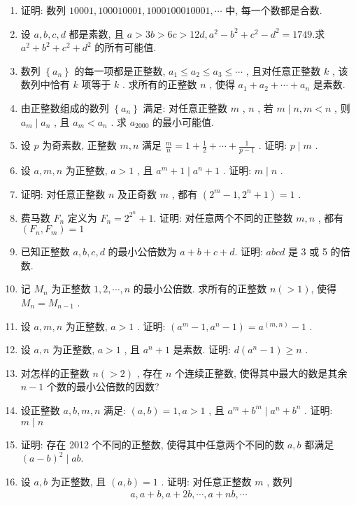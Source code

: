 \begin{enumerate}
	\item 证明: 数列 $10001,100010001,1000100010001, \cdots$ 中, 每一个数都是合数.
	\item 设 $a ,  b ,  c ,  d$ 都是素数, 且 $a>3 b>6 c>12 d, a^{2}-b^{2}+c^{2}-d^{2}=1749$.求 $a^{2}+b^{2}+c^{2}+d^{2}$ 的所有可能值.
	\item 数列 $\left\{a_{n}\right\}$ 的每一项都是正整数,  $a_{1} \leqslant a_{2} \leqslant a_{3} \leqslant \cdots$ , 且对任意正整数 $k$ , 该数列中恰有 $k$ 项等于 $k$ . 求所有的正整数 $n$ , 使得 $a_{1}+a_{2}+\cdots+a_{n}$ 是素数.
	\item 由正整数组成的数列 $\left\{a_{n}\right\}$ 满足: 对任意正整数 $m$ ,  $n$ , 若 $m \mid n ,  m<n$ , 则 $a_{m} \mid a_{n}$ , 且 $a_{m}<a_{n}$ . 求 $a_{2000}$ 的最小可能值.
	\item 设 $p$ 为奇素数, 正整数 $m ,  n$ 满足 $\frac{m}{n}=1+\frac{1}{2}+\cdots+\frac{1}{p-1}$ . 证明:  $p \mid m$ .
	\item 设 $a ,  m ,  n$ 为正整数,  $a>1$ , 且 $a^{m}+1 \mid a^{n}+1$ . 证明:  $m \mid n$ .
	\item 证明: 对任意正整数 $n$ 及正奇数 $m$ , 都有 $\left(2^{m}-1,2^{n}+1\right)=1$ .
	\item 费马数 $F_{n}$ 定义为 $F_{n}=2^{2^{n}}+1$. 证明: 对任意两个不同的正整数 $m ,  n$ , 都有 $\left(F_{n}, F_{m}\right)=1$
	\item 已知正整数 $a ,  b ,  c ,  d$ 的最小公倍数为 $a+b+c+d$. 证明: $a b c d$ 是 3 或 5 的倍数.
	\item 记 $M_{n}$ 为正整数 $1,2, \cdots, n$ 的最小公倍数. 求所有的正整数 $n(>1)$, 使得 $M_{n}=M_{n-1}$ .
	\item 设 $a ,  m ,  n$ 为正整数,  $a>1$ . 证明:  $\left(a^{m}-1, a^{n}-1\right)=a^{(m, n)}-1$ .
	\item 设 $a ,  n$ 为正整数,  $a>1$ , 且 $a^{n}+1$ 是素数. 证明:  $d\left(a^{n}-1\right) \geqslant n$ .
	\item 对怎样的正整数 $n(>2)$ , 存在 $n$ 个连续正整数, 使得其中最大的数是其余 $n-1$ 个数的最小公倍数的因数?
	\item 设正整数 $a ,  b ,  m ,  n$ 满足:  $(a, b)=1, a>1$ , 且 $a^{m}+b^{m} \mid a^{n}+b^{n}$ . 证明:  $m \mid n$
	\item 证明: 存在 2012 个不同的正整数, 使得其中任意两个不同的数 $a ,  b$ 都满足 $(a-b)^{2} \mid a b$.
	\item 设 $a ,  b$ 为正整数, 且 $(a, b)=1$ . 证明: 对任意正整数 $m$ , 数列
	      \begin{align*}
		      a, a+b, a+2 b, \cdots, a+n b, \cdots
	      \end{align*}

\end{enumerate}
